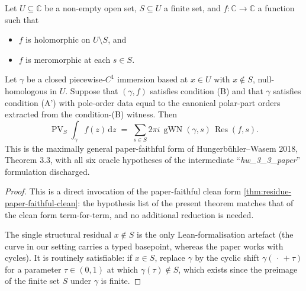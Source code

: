 \begin{theorem}
  \label{thm:hw-3-3-clean-full-mero}
  \leanok
  Let $U \subseteq \mathbb{C}$ be a non-empty open set, $S \subseteq U$
  a finite set, and $f : \mathbb{C} \to \mathbb{C}$ a function such
  that
  \begin{itemize}
    \item $f$ is holomorphic on $U \setminus S$, and
    \item $f$ is meromorphic at each $s \in S$.
  \end{itemize}
  Let $\gamma$ be a closed piecewise-$C^{1}$ immersion based at
  $x \in U$ with $x \notin S$, null-homologous in $U$. Suppose
  that $(\gamma, f)$ satisfies condition (B) and that $\gamma$
  satisfies condition (A') with pole-order data equal to the
  canonical polar-part orders extracted from the
  condition-(B) witness. Then
  \[
    \operatorname{PV}_S\!\!\int_\gamma f(z)\,\mathrm{d}z
    \;=\; \sum_{s \in S} 2 \pi i \,
      \operatorname{gWN}(\gamma, s) \, \operatorname{Res}(f, s).
  \]
  This is the maximally general paper-faithful form of
  Hungerbühler--Wasem 2018, Theorem 3.3, with all six oracle
  hypotheses of the intermediate ``\emph{hw\_3\_3\_paper}'' formulation
  discharged.
\end{theorem}

\begin{proof}
  \leanok
  This is a direct invocation of the paper-faithful clean form
  \cref{thm:residue-paper-faithful-clean}: the hypothesis list of
  the present theorem matches that of the clean form term-for-term,
  and no additional reduction is needed.

  The single structural residual $x \notin S$ is the only
  Lean-formalisation artefact (the curve in our setting carries a
  typed basepoint, whereas the paper works with cycles). It is
  routinely satisfiable: if $x \in S$, replace $\gamma$ by the
  cyclic shift $\gamma(\,\cdot\, + \tau)$ for a parameter
  $\tau \in (0,1)$ at which $\gamma(\tau) \notin S$, which exists
  since the preimage of the finite set $S$ under $\gamma$ is
  finite.
\end{proof}
